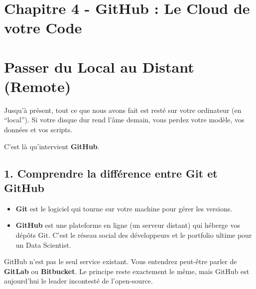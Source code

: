 \documentclass[
  letterpaper,
  DIV=11,
  numbers=noendperiod]{scrreprt}
\providecommand{\tightlist}{%
  \setlength{\itemsep}{0pt}\setlength{\parskip}{0pt}}
\begin{document}

\section{Chapitre 4 - GitHub : Le Cloud de votre
Code}\label{chapitre-4---github-le-cloud-de-votre-code}


\section{Passer du Local au Distant
(Remote)}\label{passer-du-local-au-distant-remote}

Jusqu'à présent, tout ce que nous avons fait est resté sur votre
ordinateur (en ``local''). Si votre disque dur rend l'âme demain, vous
perdez votre modèle, vos données et vos scripts.

C'est là qu'intervient \textbf{GitHub}.

\subsection{1. Comprendre la différence entre Git et
GitHub}\label{comprendre-la-diffuxe9rence-entre-git-et-github}

\begin{itemize}
\tightlist
\item
  \textbf{Git} est le logiciel qui tourne sur votre machine pour gérer
  les versions.
\item
  \textbf{GitHub} est une plateforme en ligne (un serveur distant) qui
  héberge vos dépôts Git. C'est le réseau social des développeurs et le
  portfolio ultime pour un Data Scientist.
\end{itemize}

\begin{tcolorbox}[enhanced jigsaw, arc=.35mm, bottomrule=.15mm, bottomtitle=1mm, breakable, colback=white, colbacktitle=quarto-callout-important-color!10!white, colframe=quarto-callout-important-color-frame, coltitle=black, left=2mm, leftrule=.75mm, opacityback=0, opacitybacktitle=0.6, rightrule=.15mm, title=\textcolor{quarto-callout-important-color}{\faExclamation}\hspace{0.5em}{Important}, titlerule=0mm, toprule=.15mm, toptitle=1mm]

GitHub n'est pas le seul service existant. Vous entendrez peut-être
parler de \textbf{GitLab} ou \textbf{Bitbucket}. Le principe reste
exactement le même, mais GitHub est aujourd'hui le leader incontesté de
l'open-source.

\end{tcolorbox}
\end{document}
